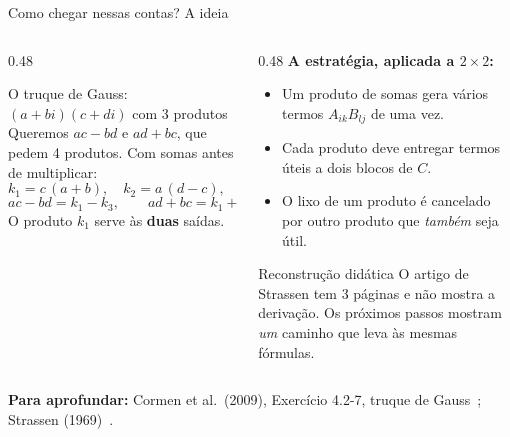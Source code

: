 \documentclass[aspectratio=169,xcolor=table]{beamer}
\newcommand{\fonte}[1]{%
  \vfill
  {\tiny\color{gray!55!black}\textbf{Para aprofundar:} #1\par}%
}
\newcommand{\util}[1]{\textcolor{blue!70!black}{#1}}
\newcommand{\lixo}[1]{\textcolor{red!75!black}{#1}}
\begin{document}
\begin{frame}{Como chegar nessas contas? A ideia}
  \begin{columns}[T]
    \begin{column}{0.48\textwidth}
      \begin{exampleblock}{O truque de Gauss: $(a+bi)(c+di)$ com 3 produtos}
        \scriptsize
        Queremos $ac-bd$ e $ad+bc$, que pedem 4 produtos. Com somas antes de multiplicar:
        \[
          k_1 = c\,(a+b),\quad k_2 = a\,(d-c),\quad k_3 = b\,(c+d)
        \]
        \vspace{-10pt}
        \[
          ac-bd = k_1-k_3, \qquad ad+bc = k_1+k_2
        \]
        O produto $k_1$ serve às \textbf{duas} saídas.
      \end{exampleblock}
    \end{column}
    \begin{column}{0.48\textwidth}
      \textbf{A estratégia, aplicada a $2\times2$:}
      \scriptsize
      \begin{itemize}
        \item Um produto de somas gera vários termos $A_{ik}B_{lj}$ de uma vez.
        \item Cada produto deve entregar termos \util{úteis} a dois blocos de $C$.
        \item O \lixo{lixo} de um produto é cancelado por outro produto que
              \emph{também} seja útil.
      \end{itemize}
      \begin{alertblock}{Reconstrução didática}
        \scriptsize O artigo de Strassen tem 3 páginas e não mostra a derivação.
        Os próximos passos mostram \emph{um} caminho que leva às mesmas fórmulas.
      \end{alertblock}
    \end{column}
  \end{columns}
  \fonte{Cormen et al.\ (2009), Exercício 4.2-7, truque de Gauss~\cite{cormen2009introduction};
    Strassen (1969)~\cite{strassen1969gaussian}.}
\end{frame}
\end{document}
